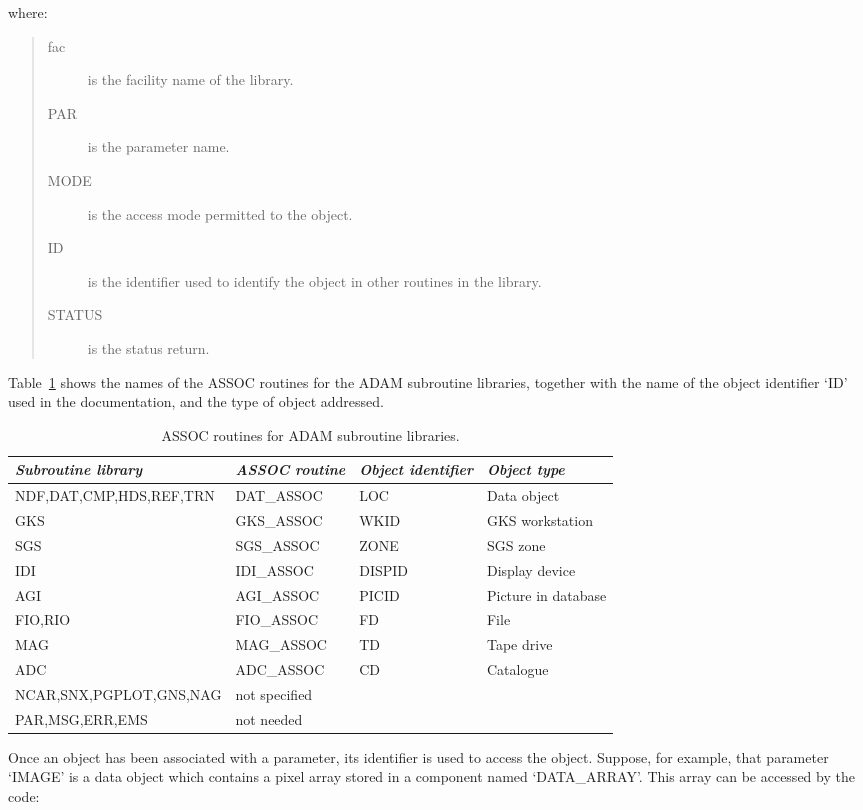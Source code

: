 where:
\begin{quote}
\begin{description}
\item [fac] is the facility name of the library.
\item [PAR] is the parameter name.
\item [MODE] is the access mode permitted to the object.
\item [ID] is the identifier used to identify the object in other routines in
 the library.
\item [STATUS] is the status return.
\end{description}
\end{quote}
Table~\ref{T_assoc} shows the names of the ASSOC routines for the ADAM
subroutine libraries, together with the name of the object identifier `ID' used
in the documentation, and the type of object addressed.
\begin{table}[htb]
\centering
\begin{tabular}{|l|l|l|l|}
\hline
{\em Subroutine library} & {\em ASSOC routine} & {\em Object identifier} &
 {\em Object type} \\
\hline
NDF,DAT,CMP,HDS,REF,TRN & DAT\_ASSOC    & LOC    & Data object \\
GKS                     & GKS\_ASSOC    & WKID   & GKS workstation \\
SGS                     & SGS\_ASSOC    & ZONE   & SGS zone \\
IDI                     & IDI\_ASSOC    & DISPID & Display device \\
AGI                     & AGI\_ASSOC    & PICID  & Picture in database \\
FIO,RIO                 & FIO\_ASSOC    & FD     & File \\
MAG                     & MAG\_ASSOC    & TD     & Tape drive \\
ADC                     & ADC\_ASSOC    & CD     & Catalogue \\
NCAR,SNX,PGPLOT,GNS,NAG & not specified &        & \\
PAR,MSG,ERR,EMS         & not needed    &        & \\
\hline
\end{tabular}
\caption{ASSOC routines for ADAM subroutine libraries.}
\label{T_assoc}
\end{table}

Once an object has been associated with a parameter, its identifier is
used to access the object.
Suppose, for example, that parameter `IMAGE' is a data object which contains
a pixel array stored in a component named `DATA\_ARRAY'.
This array can be accessed by the code:


